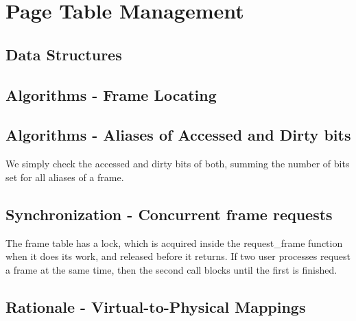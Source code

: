 \section{Page Table Management}

\subsection{Data Structures}


\subsection{Algorithms - Frame Locating}


\subsection{Algorithms - Aliases of Accessed and Dirty bits}


We simply check the accessed and dirty bits of both, summing the number of bits
set for all aliases of a frame.

\subsection{Synchronization - Concurrent frame requests}


The frame table has a lock, which is acquired inside the request\_frame
function when it does its work, and released before it returns. If two user
processes request a frame at the same time, then the second call blocks
until the first is finished.

\subsection{Rationale - Virtual-to-Physical Mappings}

